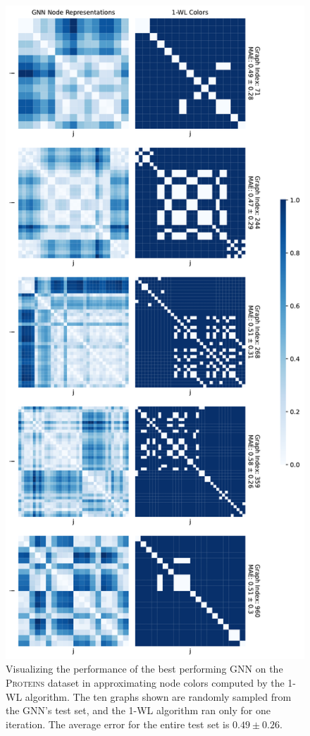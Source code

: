 \begin{figure}[!ht]
\begin{minipage}[b]{0.45992852703\textwidth}
    \end{minipage}
    \hfill
    \begin{minipage}[b]{0.53007147296\textwidth}
        \includegraphics[width=\textwidth, right]{Figures/heatmaps_PROTEINS_1.pdf}
    \end{minipage}
    \hfill
    \caption{Visualizing the performance of the best performing GNN on the \textsc{Proteins} dataset in approximating node colors computed by the 1-WL algorithm. The ten graphs shown are randomly sampled from the GNN's test set, and the 1-WL algorithm ran only for one iteration. The average error for the entire test set is $0.49 \pm 0.26$.}
\end{figure}
